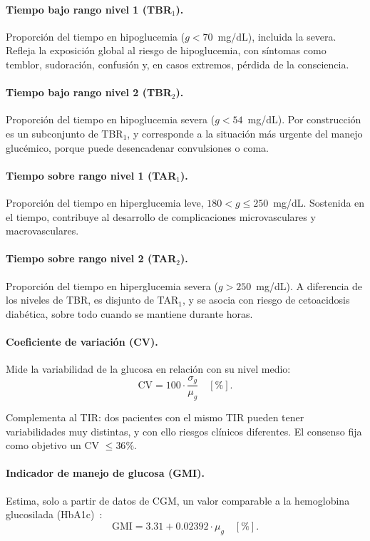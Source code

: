 \documentclass{report}
\begin{document}
\paragraph{Tiempo bajo rango nivel 1 (TBR$_1$).} Proporción del tiempo en hipoglucemia ($g < 70$~mg/dL), incluida la severa. Refleja la exposición global al riesgo de hipoglucemia, con síntomas como temblor, sudoración, confusión y, en casos extremos, pérdida de la consciencia.

\paragraph{Tiempo bajo rango nivel 2 (TBR$_2$).} Proporción del tiempo en hipoglucemia severa ($g < 54$~mg/dL). Por construcción es un subconjunto de TBR$_1$, y corresponde a la situación más urgente del manejo glucémico, porque puede desencadenar convulsiones o coma.

\paragraph{Tiempo sobre rango nivel 1 (TAR$_1$).} Proporción del tiempo en hiperglucemia leve, $180 < g \leq 250$~mg/dL. Sostenida en el tiempo, contribuye al desarrollo de complicaciones microvasculares y macrovasculares.

\paragraph{Tiempo sobre rango nivel 2 (TAR$_2$).} Proporción del tiempo en hiperglucemia severa ($g > 250$~mg/dL). A diferencia de los niveles de TBR, es disjunto de TAR$_1$, y se asocia con riesgo de cetoacidosis diabética, sobre todo cuando se mantiene durante horas.

\paragraph{Coeficiente de variación (CV).} Mide la variabilidad de la glucosa en relación con su nivel medio:
\begin{equation}
\label{eq:cv}
\mathrm{CV} = 100 \cdot \frac{\sigma_g}{\mu_g} \quad [\%].
\end{equation}

Complementa al TIR: dos pacientes con el mismo TIR pueden tener variabilidades muy distintas, y con ello riesgos clínicos diferentes. El consenso fija como objetivo un CV $\leq 36\%$.

\paragraph{Indicador de manejo de glucosa (GMI).} Estima, solo a partir de datos de CGM, un valor comparable a la hemoglobina glucosilada (HbA1c)~\cite{bergenstal2018}:
\begin{equation}
\label{eq:gmi}
\mathrm{GMI} = 3.31 + 0.02392 \cdot \mu_g \quad [\%].
\end{equation}
\end{document}
